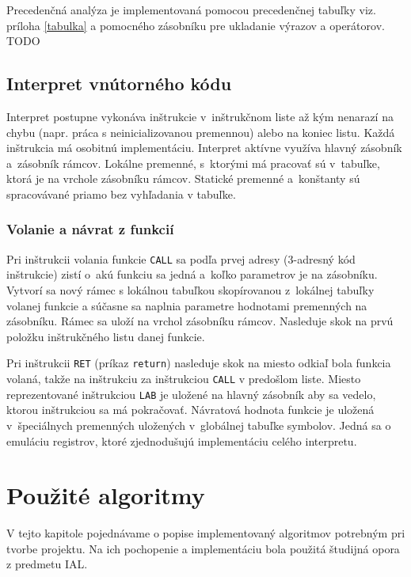 \documentclass[11pt,a4paper]{article}
\begin{document}
        Precedenčná analýza je implementovaná pomocou precedenčnej tabuľky viz.
        príloha \ref{tabulka} a pomocného zásobníku pre ukladanie výrazov a operátorov.
        TODO
    \subsection{Interpret vnútorného kódu}
    \label{interpret}
    Interpret postupne vykonáva inštrukcie v~inštrukčnom liste až kým nenarazí
    na chybu (napr. práca s neinicializovanou premennou) alebo na koniec listu.
    Každá inštrukcia má osobitnú implementáciu. Interpret aktívne využíva hlavný
    zásobník a~zásobník rámcov. Lokálne premenné, s~ktorými má pracovať  sú v~tabuľke,
    ktorá je na vrchole zásobníku rámcov. Statické premenné a~konštanty sú spracovávané
    priamo bez vyhľadania v tabuľke.

       \subsubsection{Volanie a návrat z funkcií}
       \label{funkcia}
       Pri inštrukcii volania funkcie \texttt{CALL} sa podľa prvej adresy
       (3-adresný kód inštrukcie) zistí o~akú funkciu sa jedná a~koľko parametrov
       je na zásobníku. Vytvorí sa nový rámec s lokálnou tabuľkou skopírovanou
       z~lokálnej tabuľky volanej funkcie a súčasne sa naplnia parametre
       hodnotami premenných na zásobníku. Rámec sa uloží na vrchol zásobníku rámcov.
       Nasleduje skok na prvú položku inštrukčného listu danej funkcie.


       Pri inštrukcii \texttt{RET} (príkaz \texttt{return}) nasleduje skok na
       miesto odkiaľ bola funkcia volaná, takže na inštrukciu za inštrukciou
       \texttt{CALL} v predošlom liste. Miesto reprezentované inštrukciou
       \texttt{LAB} je uložené na hlavný zásobník aby sa vedelo, ktorou inštrukciou
       sa má pokračovať. Návratová hodnota funkcie je uložená v~špeciálnych
       premenných uložených v~globálnej tabuľke symbolov. Jedná sa o emuláciu
       registrov, ktoré zjednodušujú implementáciu celého interpretu.




\section{Použité algoritmy}
\label{algoritmy}

 V tejto kapitole pojednávame o popise implementovaný algoritmov potrebným pri tvorbe projektu. Na ich pochopenie a implementáciu bola použitá študijná opora z predmetu IAL.
\end{document}
